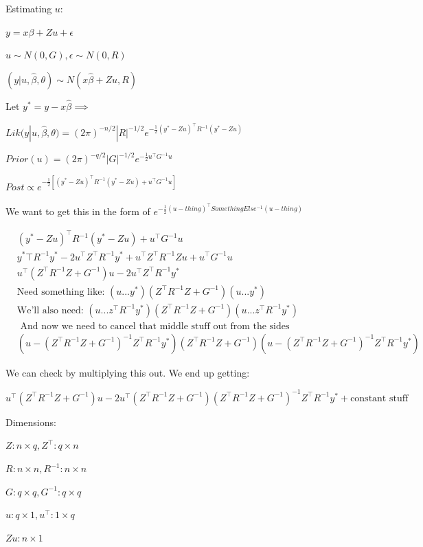 \documentclass{article}
\begin{document}
Estimating $u$:

$y = x\beta + Zu + \epsilon$

$u \sim N(0, G), \epsilon \sim N(0, R)$

$(y | u, \hat{\beta}, \theta) \sim N(x\hat{\beta} + Zu, R)$

Let $y^* = y - x\hat{\beta} \implies$

$Lik(y|u,\hat{\beta}, \theta) = (2\pi)^{-n/2}|R|^{-1/2}e^{-\frac{1}{2}(y^* - Zu)^{\top}R^{-1}(y^* - Zu)}$

$Prior(u) = (2\pi)^{-q/2}|G|^{-1/2}e^{-\frac{1}{2}u^{\top}G^{-1}u}$

$Post \propto e^{-\frac{1}{2}[(y^* - Zu)^{\top}R^{-1}(y^* - Zu) + u^{\top}G^{-1}u]}$

We want to get this in the form of $e^{-\frac{1}{2}(u -thing)^{\top}SomethingElse^{-1}(u -thing)}$

$$
\begin{aligned}
& (y^* - Zu)^{\top}R^{-1}(y^* - Zu) + u^{\top}G^{-1}u \\
& y^*{\top}R^{-1}y^* - 2u^{\top}Z^{\top}R^{-1}y^* + u^{\top}Z^{\top}R^{-1}Zu + u^{\top}G^{-1}u \\
& u^{\top}(Z^{\top}R^{-1}Z + G^{-1})u - 2u^{\top}Z^{\top}R^{-1}y^* \\
& \text{Need something like: } (u...y^*)(Z^{\top}R^{-1}Z + G^{-1})(u...y^*) \\
& \text{We'll also need: } (u...z^{\top}R^{-1}y^*)(Z^{\top}R^{-1}Z + G^{-1})(u...z^{\top}R^{-1}y^*) \\
& \text{ And now we need to cancel that middle stuff out from the sides} \\
& (u - (Z^{\top}R^{-1}Z + G^{-1})^{-1}Z^{\top}R^{-1}y^*)(Z^{\top}R^{-1}Z + G^{-1})(u - (Z^{\top}R^{-1}Z + G^{-1})^{-1}Z^{\top}R^{-1}y^*)
\end{aligned}
$$

We can check by multiplying this out. We end up getting:

$u^{\top}(Z^{\top}R^{-1}Z + G^{-1})u - 2u^{\top}(Z^{\top}R^{-1}Z+G^{-1})(Z^{\top}R^{-1}Z+G^{-1})^{-1}Z^{\top}R^{-1}y^* + \text{constant stuff}$

Dimensions: 

$Z: n \times q, Z^{\top}: q \times n$

$R: n \times n, R^{-1}: n \times n$

$G: q \times q, G^{-1}: q \times q$

$u: q \times 1, u^{\top}: 1 \times q$

$Zu: n \times 1$
\end{document}
